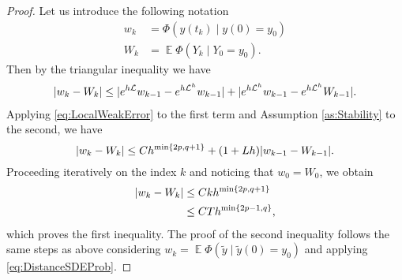 \documentclass{siamart1116}
\numberwithin{theorem}{section}
\DeclarePairedDelimiter{\abs}{\lvert}{\rvert}
\newcommand{\diffL}{\mathcal{L}}
\newcommand{\E}{\operatorname{\mathbb{E}}}
\begin{document}
\begin{proof} Let us introduce the following notation
	\begin{equation}
	\begin{aligned}
		w_k &= \Phi(y(t_k) \mid y(0) = y_0)\\
		W_k &= \E\Phi(Y_k \mid Y_0 = y_0).
	\end{aligned}
	\end{equation}
	Then by the triangular inequality we have
	\begin{equation}
	\begin{aligned}
		\abs{w_k - W_k} \leq \abs{e^{h\diffL}w_{k-1} - e^{h\diffL^h}w_{k-1}} + \abs{e^{h\diffL^h}w_{k-1} - e^{h\diffL^h}W_{k-1}}.
	\end{aligned}
	\end{equation}
	Applying \eqref{eq:LocalWeakError} to the first term and Assumption \ref{as:Stability} to the second, we have
	\begin{equation}
		\abs{w_k - W_k} \leq Ch^{\min\{2p, q + 1\}} + (1 + Lh)\abs{w_{k-1} - W_{k-1}}.
	\end{equation} 
	Proceeding iteratively on the index $k$ and noticing that $w_0 = W_0$, we obtain
	\begin{equation}
	\begin{aligned}
		\abs{w_k - W_k} &\leq C k h^{\min\{2p, q + 1\}}\\
		&\leq C T h^{\min\{2p - 1, q\}},	
	\end{aligned}
	\end{equation}
	which proves the first inequality. The proof of the second inequality follows the same steps as above considering $w_k = \E\Phi(\tilde y\mid \tilde y(0) = y_0)$ and applying \eqref{eq:DistanceSDEProb}. 
\end{proof}
\end{document}
